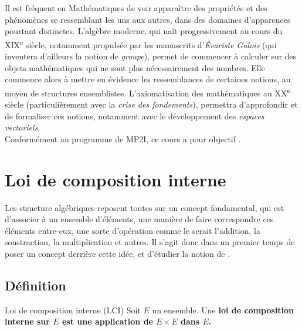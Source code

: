 \documentclass[a4paper,french,bookmarks]{article}
\begin{document}
    \def\authorvar{DRISSI Rayan}

\qquad Il est fréquent en Mathématiques de voir apparaître des propriétés et des phénomènes se ressemblant les uns aux autres, dans des domaines d'apparences pourtant distinctes. L'algèbre moderne, qui naît progressivement au cours du \textsc{XIX}\textsuperscript{e} siècle, notamment propulsée par les manuscrits d'\textit{Évariste Galois} (qui inventera d'ailleurs la notion de \textit{groupe}), permet de commencer à calculer sur des objets mathématiques qui ne sont plus nécessairement des nombres. Elle commence alors à mettre en évidence les ressemblances de certaines notions, au moyen de structures ensemblistes. L'axiomatisation des mathématiques au XX\textsuperscript{e} siècle (particulièrement avec la \textit{crise des fondements}), permettra d'approfondir et de formaliser ces notions, notamment avec le développement des \textit{espaces vectoriels}.\\

\qquad Conformément au programme de MP2I, ce cours a pour objectif .

\initcours

\section{Loi de composition interne}

\qquad Les structure algébriques reposent toutes sur un concept fondamental, qui est d'associer à un ensemble d'éléments, une manière de faire correspondre ces éléments entre-eux, une sorte d'opération comme le serait l'addition, la soustraction, la multiplication et autres. Il s'agit donc dans un premier temps de poser un concept derrière cette idée, et d'étudier la notion de .

\subsection{Définition}

\begin{definition}{Loi de composition interne (LCI)}{}
Soit $E$ un ensemble. Une \bf{loi de composition interne} sur $E$ est une application de $E \times E$ dans $E$.
\end{definition}
\end{document}
